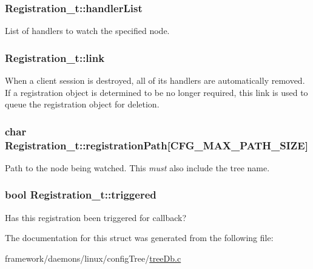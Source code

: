 \subsubsection[{\texorpdfstring{handler\+List}{handlerList}}]{ Registration\+\_\+t\+::handler\+List}\hypertarget{struct_registration__t_a0d251cb49e76d015d146f02326bfde0f}{}\label{struct_registration__t_a0d251cb49e76d015d146f02326bfde0f}


List of handlers to watch the specified node. 

\subsubsection[{\texorpdfstring{link}{link}}]{ Registration\+\_\+t\+::link}\hypertarget{struct_registration__t_a4f570436979868525897c75a16f8ca32}{}\label{struct_registration__t_a4f570436979868525897c75a16f8ca32}
When a client session is destroyed, all of it\textquotesingle{}s handlers are automatically removed. If a registration object is determined to be no longer required, this link is used to queue the registration object for deletion. 
\subsubsection[{\texorpdfstring{registration\+Path}{registrationPath}}]{\setlength{\rightskip}{0pt plus 5cm}char Registration\+\_\+t\+::registration\+Path\mbox{[}{\bf C\+F\+G\+\_\+\+M\+A\+X\+\_\+\+P\+A\+T\+H\+\_\+\+S\+I\+ZE}\mbox{]}}\hypertarget{struct_registration__t_ab5751741b6ecdd12a64e99cc94033e3e}{}\label{struct_registration__t_ab5751741b6ecdd12a64e99cc94033e3e}
Path to the node being watched. This {\itshape must} also include the tree name. 
\subsubsection[{\texorpdfstring{triggered}{triggered}}]{\setlength{\rightskip}{0pt plus 5cm}bool Registration\+\_\+t\+::triggered}\hypertarget{struct_registration__t_a8634db3533765fee7ab0f75872c9b4a6}{}\label{struct_registration__t_a8634db3533765fee7ab0f75872c9b4a6}
Has this registration been triggered for callback? 

The documentation for this struct was generated from the following file\+:\begin{DoxyCompactItemize}
\item 
framework/daemons/linux/config\+Tree/\hyperlink{tree_db_8c}{tree\+Db.\+c}\end{DoxyCompactItemize}
